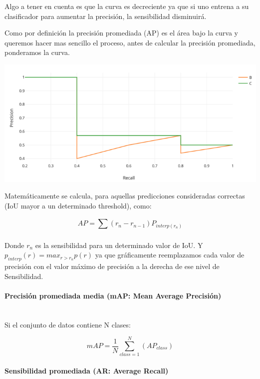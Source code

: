 Algo a tener en cuenta es que la curva es decreciente ya que si uno entrena a su clasificador para aumentar la precisión, la sensibilidad disminuirá.\par
Como por definición la precisión promediada (AP) es el área bajo la curva y queremos hacer mas sencillo el proceso, antes de calcular la precisión promediada, ponderamos la curva.\par

\begin{center}
    \includegraphics[scale=0.5]{Tesis/Capitulos/07_RESULTADOS/fig/PrecisionSensibilidadSuave.png}
\end{center}

Matemáticamente se calcula, para aquellas predicciones consideradas correctas (IoU mayor a un determinado threshold), como:

\[AP = \sum_{}^{}(r_n - r_{n-1}) P_{interp(r_n)} \]

Donde $r_n$ es la sensibilidad para un determinado valor de IoU. Y $p_{interp}(r) = max_{r>r_n} p(r)$ ya que gráficamente reemplazamos cada valor de precisión con el valor máximo de precisión a la derecha de ese nivel de Sensibilidad.

\paragraph{Precisión promediada media (mAP: Mean Average Precisión)}\mbox{}\\

Si el conjunto de datos contiene N clases:

\[mAP = \frac{1}{N}  \sum_{class=1}^{N}(AP_{class})  \]

\paragraph{Sensibilidad promediada (AR: Average Recall)}\mbox{}\\


